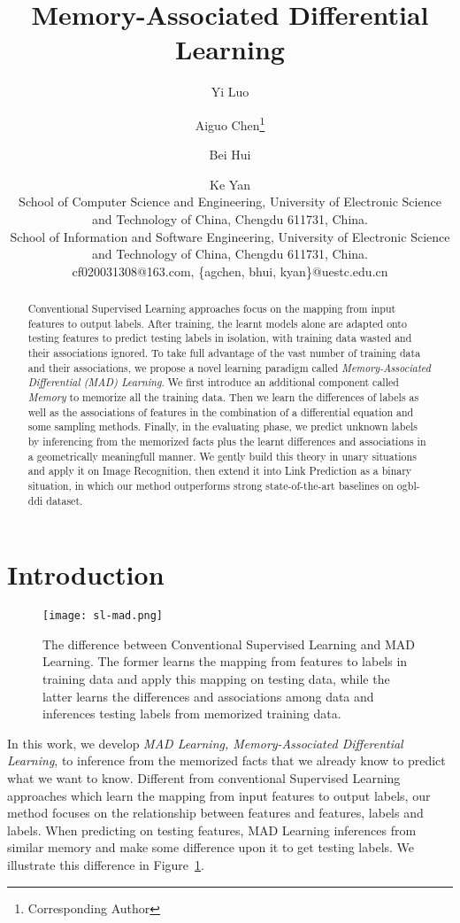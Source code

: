 \documentclass{article}
\title{Memory-Associated Differential Learning}
\author{
Yi Luo
\and
Aiguo Chen\footnote{Corresponding Author}\and
Bei Hui\and
Ke Yan\\
\affiliations
School of Computer Science and Engineering, University of Electronic Science and Technology of China, Chengdu 611731, China.\\
School of Information and Software Engineering, University of Electronic Science and Technology of China, Chengdu 611731, China.\\
\emails
cf020031308@163.com,
\{agchen, bhui, kyan\}@uestc.edu.cn
}
\begin{document}
\maketitle

\begin{abstract}
Conventional Supervised Learning approaches focus on the mapping from
input features to output labels. After training, the learnt models alone
are adapted onto testing features to predict testing labels in isolation,
with training data wasted and their associations ignored. To take full
advantage of the vast number of training data and their associations,
we propose a novel learning paradigm called
\emph{Memory-Associated Differential (MAD) Learning}. We first introduce
an additional component called \emph{Memory} to memorize all the training
data. Then we learn the differences of labels as well as the associations
of features in the combination of a differential equation and some
sampling methods. Finally, in the evaluating phase, we predict unknown
labels by inferencing from the memorized facts plus the learnt
differences and associations in a geometrically meaningfull manner. We
gently build this theory in unary situations and apply it on Image
Recognition, then extend it into Link Prediction as a binary situation,
in which our method outperforms strong state-of-the-art baselines on
ogbl-ddi dataset.
\end{abstract}

\hypertarget{introduction}{\section{Introduction}
\label{sec:introduction}}



\begin{figure}
\centering
\texttt{[image: sl-mad.png]}
\caption{
  The difference between Conventional Supervised Learning and MAD Learning.
  The former learns the mapping from features to labels in training data
  and apply this mapping on testing data, while the latter learns the
  differences and associations among data and inferences testing labels
  from memorized training data.
}
\label{fig:sl-mad}
\end{figure}

In this work, we develop \emph{MAD Learning,
Memory-Associated Differential Learning}, to inference from the
memorized facts that we already know to predict what we want to know.
Different from conventional Supervised Learning
approaches which learn the mapping from input features to output labels,
our method focuses on the relationship between features and features,
labels and labels. When predicting on testing features, MAD Learning
inferences from similar memory and make some difference upon it to get
testing labels. We illustrate this difference in Figure~\ref{fig:sl-mad}.
\end{document}
